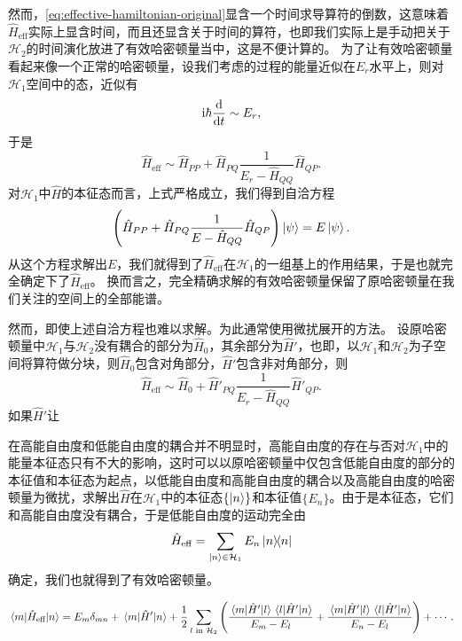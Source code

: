 \documentclass[UTF8, a4paper]{ctexart}
\newcommand*{\ii}{\mathrm{i}}
\begin{document}
然而，\eqref{eq:effective-hamiltonian-original}显含一个时间求导算符的倒数，这意味着$\hat{H}_\text{eff}$实际上显含时间，而且还显含关于时间的算符，也即我们实际上是手动把关于$\mathcal{H}_2$的时间演化放进了有效哈密顿量当中，这是不便计算的。
为了让有效哈密顿量看起来像一个正常的哈密顿量，设我们考虑的过程的能量近似在$E_r$水平上，则对$\mathcal{H}_1$空间中的态，近似有
\[
    \ii \hbar \dv{t} \sim E_r,
\]
于是
\[
    \hat{H}_\text{eff} \sim \hat{H}_{PP} + \hat{H}_{PQ} \frac{1}{E_r - \hat{H}_{QQ}} \hat{H}_{QP}.
\]
对$\mathcal{H}_1$中$\hat{H}$的本征态而言，上式严格成立，我们得到自洽方程
\begin{equation}
    \left( \hat{H}_{PP} + \hat{H}_{PQ} \frac{1}{E - \hat{H}_{QQ}} \hat{H}_{QP} \right) \ket{\psi} = E \ket{\psi}.
\end{equation}
从这个方程求解出$E$，我们就得到了$\hat{H}_\text{eff}$在$\mathcal{H}_1$的一组基上的作用结果，于是也就完全确定下了$\hat{H}_\text{eff}$。
换而言之，完全精确求解的有效哈密顿量保留了原哈密顿量在我们关注的空间上的全部能谱。

然而，即使上述自洽方程也难以求解。为此通常使用微扰展开的方法。
设原哈密顿量中$\mathcal{H}_1$与$\mathcal{H}_2$没有耦合的部分为$\hat{H}_0$，其余部分为$\hat{H}'$，也即，以$\mathcal{H}_1$和$\mathcal{H}_2$为子空间将算符做分块，则$\hat{H}_0$包含对角部分，$\hat{H}'$包含非对角部分，则
\[
    \hat{H}_\text{eff} \sim \hat{H}_{0} + \hat{H}'_{PQ} \frac{1}{E_r - \hat{H}_{QQ}} \hat{H}'_{QP}.
\]
如果$\hat{H}'$让

在高能自由度和低能自由度的耦合并不明显时，高能自由度的存在与否对$\mathcal{H}_1$中的能量本征态只有不大的影响，这时可以以原哈密顿量中仅包含低能自由度的部分的本征值和本征态为起点，以低能自由度和高能自由度的耦合以及高能自由度的哈密顿量为微扰，求解出$\hat{H}$在$\mathcal{H}_1$中的本征态$\{\ket{n}\}$和本征值$\{E_n\}$。由于是本征态，它们和高能自由度没有耦合，于是低能自由度的运动完全由
\begin{equation}
    \hat{H}_\text{eff} = \sum_{\ket{n} \in \mathcal{H}_1} E_n \dyad{n}
\end{equation}
确定，我们也就得到了有效哈密顿量。

\begin{equation}
    \mel{m}{\hat{H}_\text{eff}}{n} = E_m \delta_{mn} + \mel{m}{\hat{H}'}{n} + \frac{1}{2} \sum_{\text{$l$ in $\mathcal{H}_2$}} \left( \frac{\mel{m}{\hat{H}'}{l} \mel{l}{\hat{H}'}{n}}{E_m - E_l} + \frac{\mel{m}{\hat{H}'}{l} \mel{l}{\hat{H}'}{n}}{E_n - E_l} \right) + \cdots.
\end{equation}
\end{document}
